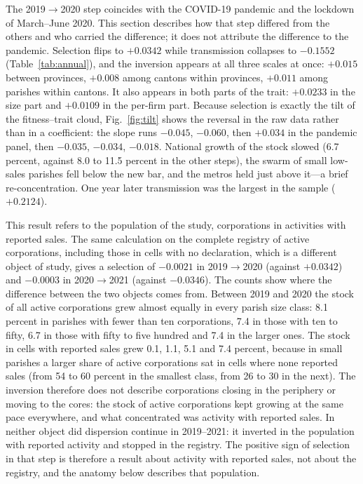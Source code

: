 \documentclass[conference]{IEEEtran}
\begin{document}
The 2019$\to$2020 step coincides with the COVID-19 pandemic and the
lockdown of March--June 2020. This section describes how that step
differed from the others and who carried the difference; it does not
attribute the difference to the pandemic. Selection flips to $+0.0342$
while transmission collapses to $-0.1552$ (Table~\ref{tab:annual}), and
the inversion appears at all three scales at once: $+0.015$ between
provinces, $+0.008$ among cantons within provinces, $+0.011$ among
parishes within cantons. It also appears in both parts of the trait:
$+0.0233$ in the size part and $+0.0109$ in the per-firm part. Because
selection is exactly the tilt of the fitness--trait cloud,
Fig.~\ref{fig:tilt} shows the reversal in the raw data rather than in a
coefficient: the slope runs $-0.045$, $-0.060$, then $+0.034$ in the
pandemic panel, then $-0.035$, $-0.034$, $-0.018$. National growth of
the stock slowed (6.7 percent, against 8.0 to 11.5 percent in the other
steps), the swarm of small low-sales parishes fell below the new bar, and
the metros held just above it---a brief re-concentration. One year later
transmission was the largest in the sample ($+0.2124$).

This result refers to the population of the study, corporations in
activities with reported sales. The same calculation on the complete
registry of active corporations, including those in cells with no
declaration, which is a different object of study, gives a selection of
$-0.0021$ in 2019$\to$2020 (against $+0.0342$) and $-0.0003$ in
2020$\to$2021 (against $-0.0346$). The counts show where the difference
between the two objects comes from. Between 2019 and 2020 the stock of all active corporations grew almost
equally in every
parish size class: 8.1 percent in parishes with fewer than ten
corporations, 7.4 in those with ten to fifty, 6.7 in those with fifty to
five hundred and 7.4 in the larger ones. The stock in cells with reported
sales grew 0.1, 1.1, 5.1 and 7.4 percent, because in small parishes a
larger share of active corporations sat in cells where none reported
sales (from 54 to 60 percent in the smallest class, from 26 to 30 in the
next). The inversion therefore does not describe corporations closing in
the periphery or moving to the cores: the stock of active corporations kept growing at the
same pace everywhere, and what concentrated was activity with reported
sales. In neither object did dispersion continue in 2019--2021: it inverted in
the population with reported activity and stopped in the registry. The
positive sign of selection in that step is therefore a result about
activity with reported sales, not about the registry, and the anatomy
below describes that population.
\end{document}
